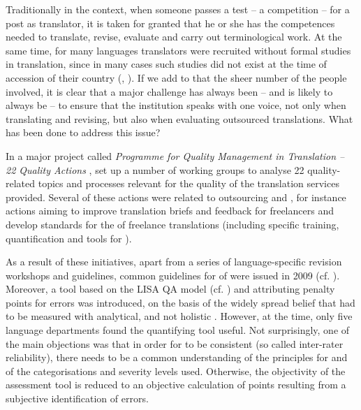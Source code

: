 \documentclass[output=paper]{langsci/langscibook}
\begin{document}
Traditionally in the  context, when someone passes a  test – a competition – for a post as translator, it is taken for granted that he or she has the competences needed to translate, revise, evaluate  and carry out terminological work. At the same time, for many languages translators were recruited without formal studies in translation, since in many cases such studies did not exist at the time of accession of their country (\citealt{Biel2011}, \citealt{Strandvik2014}). If we add to that the sheer number of the people involved, it is clear that a major challenge has always been – and is likely to always be – to ensure that the institution speaks with one voice, not only when translating and revising, but also when evaluating outsourced translations. What has been done to address this issue?

In a major  project called \textit{Programme for Quality Management in Translation – 22 Quality Actions} \citep{DGT2009}, \citeauthor{DGT2009} set up a number of working groups to analyse 22 quality-related topics and processes relevant for the quality of the translation services provided. Several of these actions were related to outsourcing and , for instance actions aiming to improve translation briefs and feedback for freelancers and develop standards for the  of freelance translations (including specific training,  quantification and tools for ).

As a result of these initiatives, apart from a series of language-specific revision workshops and  guidelines, common guidelines for  of  were issued in 2009 (cf. \citealt{DGT2013}). Moreover, a  tool based on the LISA QA model (cf. \citealt{Doherty2013}) and attributing penalty points for errors was introduced, on the basis of the widely spread belief that  had to be measured with analytical, and not holistic . However, at the time, only five language departments found the  quantifying tool useful. Not surprisingly, one of the main objections was that in order for  to be consistent (so called inter-rater reliability), there needs to be a common understanding of the principles for  and of the  categorisations and severity levels used. Otherwise, the objectivity of the assessment tool is reduced to an objective calculation of  points resulting from a subjective identification of errors.
\end{document}
